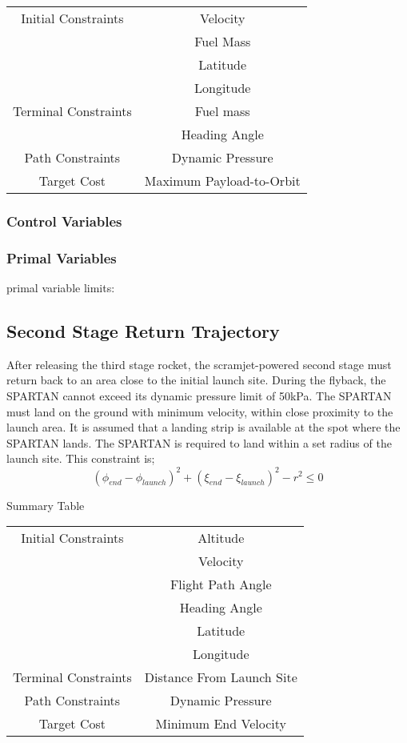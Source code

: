 \begin{tabular}{|c|c|}
	\hline Initial Constraints  & Velocity \\ & Fuel Mass  \\ & Latitude \\ & Longitude \\ 
	\hline Terminal Constraints & Fuel mass \\ & Heading Angle \\ 
	\hline Path Constraints & Dynamic Pressure \\ 
	\hline Target Cost & Maximum Payload-to-Orbit \\ 
	\hline 
\end{tabular} 

\subsubsection{Control Variables}

\subsubsection{Primal Variables}
primal variable limits:

\subsection{Second Stage Return Trajectory}
After releasing the third stage rocket, the scramjet-powered second stage must return back to an area close to the initial launch site.
During the flyback, the SPARTAN cannot exceed its dynamic pressure limit of 50kPa. 
The SPARTAN must land on the ground with minimum velocity, within close proximity to the launch area. It is assumed that a landing strip is available at the spot where the SPARTAN lands. The SPARTAN is required to land within a set radius of the launch site. This constraint is;
\begin{equation}
(\phi_{end} - \phi_{launch})^2 + (\xi_{end} - \xi_{launch})^2 - r^2 \leq 0
\end{equation}



Summary Table

\begin{tabular}{|c|c|}
	\hline Initial Constraints  & Altitude \\ & Velocity\\ & Flight Path Angle\\ & Heading Angle\\ & Latitude\\ & Longitude\\ 
	\hline Terminal Constraints &  Distance From Launch Site \\ 
	\hline Path Constraints & Dynamic Pressure \\ 
	\hline Target Cost & Minimum End Velocity \\ 
	\hline 
\end{tabular} 

